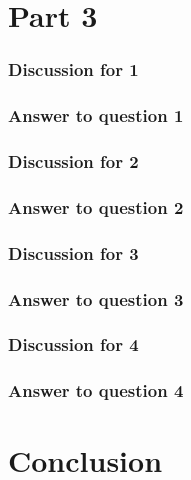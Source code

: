 \documentclass{article}
\begin{document}
\section*{Part 3}

\subsubsection*{Discussion for 1}

\subsubsection*{Answer to question 1}

\subsubsection*{Discussion for 2}

\subsubsection*{Answer to question 2}

\subsubsection*{Discussion for 3}

\subsubsection*{Answer to question 3}

\subsubsection*{Discussion for 4}

\subsubsection*{Answer to question 4}

\section*{Conclusion}
\end{document}
